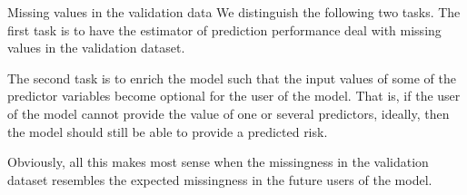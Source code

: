 \documentclass{beamer}\usepackage{listings}
\begin{document}
\begin{frame}[label={sec:orgff7a3d2}]{Missing values in the validation data}
We distinguish the following two tasks.
\vfill
The first task is
to have the estimator of prediction performance deal with missing values in the
validation dataset.

\vfill

The second task is to enrich the model such that
the input values of some of the predictor variables become optional
for the user of the model.
\vfill
That is, if the user of the model cannot provide the value of one or several predictors, ideally, then the
model should still be able to provide a predicted risk. 
\vfill

Obviously, all this makes most sense when the missingness in the
validation dataset resembles the expected missingness in the future
users of the model.
\end{frame}
\end{document}
